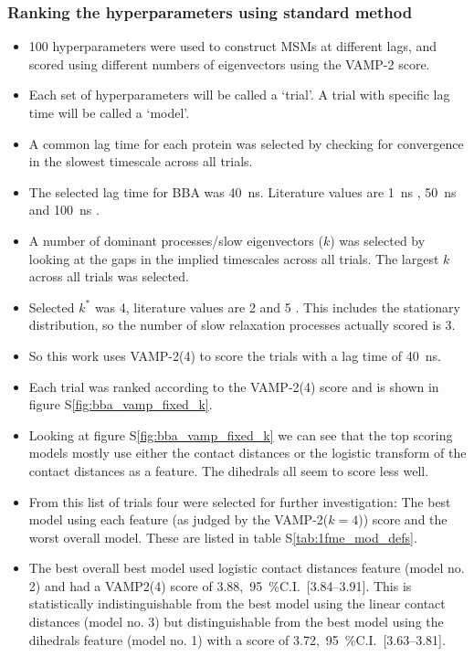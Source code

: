 \documentclass[journal=jacsat,manuscript=article]{achemso}
\newcommand{\numci}[3]{\num{#1},\ \SI{95}{\percent}C.I.\ [\numrange[range-phrase=---]{#2}{#3}]}
\newcommand*\sref[1]{%
    S\ref{#1}}
\begin{document}
\subsubsection{Ranking the hyperparameters using standard method}

\begin{itemize}
    \item 100 hyperparameters were used to construct MSMs at different lags, and scored using different numbers of eigenvectors using the VAMP-2 score. 
    \item Each set of hyperparameters will be called a  `trial'.  A trial with specific lag time will be called a `model'. 
    \item A common lag time for each protein was selected by checking for convergence in the slowest timescale across all trials. 
    \item The selected lag time for BBA was \SI{40}{\nano\second}. Literature values are  \SI{1}{\nano\second} \cite{Quantitati2018},  \SI{50}{\nano\second} \cite{Optimized_2016} and   \SI{100}{\nano\second} \cite{scherer_variational_2019}. 
    \item A number of dominant processes/slow eigenvectors ($k$) was selected by looking at the gaps in the implied timescales across all trials.  The largest $k$ across all trials was selected. 
    \item Selected $k^{*}$ was \num{4}, literature values are \num{2} \cite{Optimized_2016} and \num{5} \cite{scherer_variational_2019}. This includes the stationary distribution, so the number of slow relaxation processes actually scored is \num{3}.  
    \item So this work uses VAMP-2(4) to score the trials with a lag time of \SI{40}{\nano\second}. 
    \item Each trial was ranked according to the VAMP-2(4) score and is shown in figure \sref{fig:bba_vamp_fixed_k}. 
    \item Looking at figure \sref{fig:bba_vamp_fixed_k} we can see that the top scoring models mostly use either the contact distances or the logistic transform of the contact distances as a feature.  The dihedrals all seem to score less well. 
    \item From this list of trials four were selected for further investigation: The best model using each feature (as judged by the VAMP-2($k=4$)) score and the worst overall model.  These are listed in table \sref{tab:1fme_mod_defs}. 
    \item The best overall best model used logistic contact distances feature (model no. 2) and had a VAMP2(4) score of \numci{3.88}{3.84}{3.91}. This is statistically indistinguishable from the best model using the linear contact distances (model no. 3) but distinguishable from the best model using the dihedrals feature (model no. 1) with a score of \numci{3.72}{3.63}{3.81}. 
\end{itemize}
\end{document}
